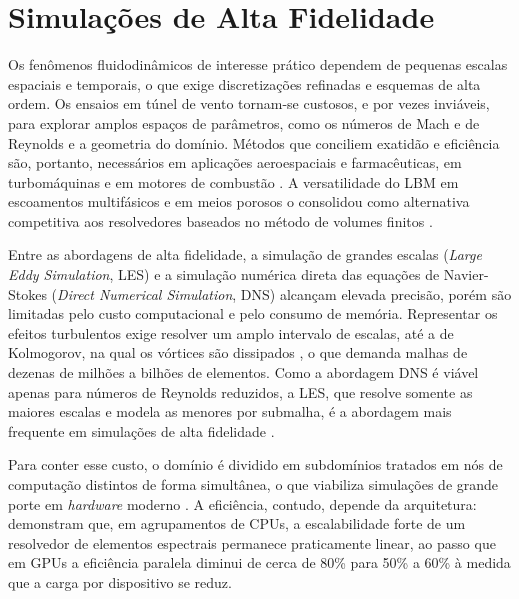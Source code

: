 
\section{Simulações de Alta Fidelidade}\label{sec:simulacoes-de-alta-fidelidade}

Os fenômenos fluidodinâmicos de interesse prático dependem de pequenas escalas espaciais e temporais, o que exige discretizações refinadas e esquemas de alta ordem.
Os ensaios em túnel de vento tornam-se custosos, e por vezes inviáveis, para explorar amplos espaços de parâmetros, como os números de Mach e de Reynolds e a geometria do domínio.
Métodos que conciliem exatidão e eficiência são, portanto, necessários em aplicações aeroespaciais e farmacêuticas, em turbomáquinas e em motores de combustão \parencite{Mira2023, Succi2001}.
A versatilidade do LBM em escoamentos multifásicos e em meios porosos o consolidou como alternativa competitiva aos resolvedores baseados no método de volumes finitos \parencite{Lauricella2025, Aniello2022}.

Entre as abordagens de alta fidelidade, a simulação de grandes escalas (\textit{Large Eddy Simulation}, LES) e a simulação numérica direta das equações de Navier-Stokes (\textit{Direct Numerical Simulation}, DNS) alcançam elevada precisão, porém são limitadas pelo custo computacional e pelo consumo de memória.
Representar os efeitos turbulentos exige resolver um amplo intervalo de escalas, até a de Kolmogorov, na qual os vórtices são dissipados \parencite{Davidson2015}, o que demanda malhas de dezenas de milhões a bilhões de elementos.
Como a abordagem DNS é viável apenas para números de Reynolds reduzidos, a LES, que resolve somente as maiores escalas e modela as menores por submalha, é a abordagem mais frequente em simulações de alta fidelidade \parencite{Karp2025}.

Para conter esse custo, o domínio é dividido em subdomínios tratados em nós de computação distintos de forma simultânea, o que viabiliza simulações de grande porte em \textit{hardware} moderno \parencite{Kolla2018}.
A eficiência, contudo, depende da arquitetura: \textcite{Karp2025} demonstram que, em agrupamentos de CPUs, a escalabilidade forte de um resolvedor de elementos espectrais permanece praticamente linear, ao passo que em GPUs a eficiência paralela diminui de cerca de 80\% para 50\% a 60\% à medida que a carga por dispositivo se reduz.


